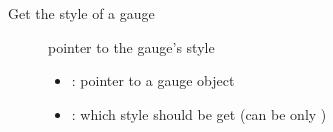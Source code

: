 \documentclass[letterpaper,10pt,english]{sphinxmanual}
\begin{document}
\begin{fulllineitems}
\label{\detokenize{object-types/gauge:_CPPv418lv_gauge_get_stylePK8lv_obj_t16lv_gauge_style_t}}%
\pysigstartmultiline
{}\label{\detokenize{object-types/gauge:lv__gauge_8h_1a7487c31b8c5e2a26478ac2a1a954c739}}%
\pysigstopmultiline
Get the style of a gauge \begin{description}
\item[{}] \leavevmode
pointer to the gauge’s style 

\item[{}] \leavevmode\begin{itemize}
\item {} 
: pointer to a gauge object 

\item {} 
: which style should be get (can be only ) 

\end{itemize}

\end{description}


\end{fulllineitems}

\end{document}
